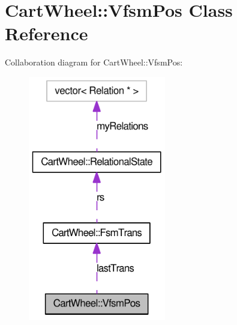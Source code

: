\hypertarget{classCartWheel_1_1VfsmPos}{
\section{CartWheel::VfsmPos Class Reference}
\label{classCartWheel_1_1VfsmPos}
}


Collaboration diagram for CartWheel::VfsmPos:\nopagebreak
\begin{figure}[H]
\begin{center}
\leavevmode
\includegraphics[width=170pt]{classCartWheel_1_1VfsmPos__coll__graph}
\end{center}
\end{figure}
